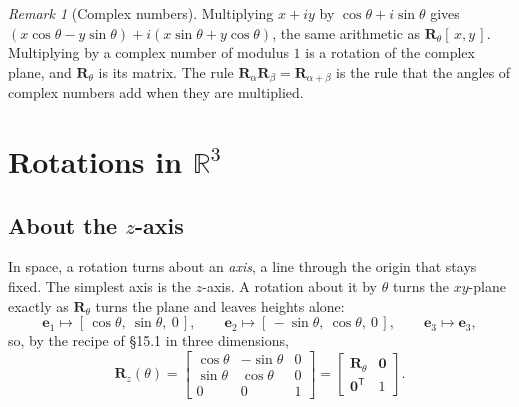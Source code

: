 \documentclass[11pt]{article}
\theoremstyle{plain}
\theoremstyle{definition}
\theoremstyle{remark}
\newtheorem*{rmk}{Remark}
\newcommand{\R}{\mathbb{R}}
\newcommand{\vc}[1]{\mathbf{#1}}
\newcommand{\mt}[1]{\mathbf{#1}}
\newcommand{\T}{^{\mathsf{T}}}
\begin{document}
\begin{rmk}[Complex numbers]
Multiplying $x+iy$ by $\cos\theta+i\sin\theta$ gives
$(x\cos\theta-y\sin\theta)+i(x\sin\theta+y\cos\theta)$, the same arithmetic as
$\mt{R}_\theta[\,x,y\,]$. Multiplying by a complex number of modulus $1$ is a
rotation of the complex plane, and $\mt{R}_\theta$ is its matrix. The rule
$\mt{R}_\alpha\mt{R}_\beta=\mt{R}_{\alpha+\beta}$ is the rule that the angles of
complex numbers add when they are multiplied.
\end{rmk}

\section{Rotations in \texorpdfstring{$\R^{3}$}{R3}}

\subsection{About the \texorpdfstring{$z$}{z}-axis}
In space, a rotation turns about an \emph{axis}, a line through the origin that
stays fixed. The simplest axis is the $z$-axis. A rotation about it by $\theta$
turns the $xy$-plane exactly as $\mt{R}_\theta$ turns the plane and leaves
heights alone:
\[
  \vc{e}_1\mapsto[\,\cos\theta,\ \sin\theta,\ 0\,],\qquad
  \vc{e}_2\mapsto[\,-\sin\theta,\ \cos\theta,\ 0\,],\qquad
  \vc{e}_3\mapsto\vc{e}_3 ,
\]
so, by the recipe of \S15.1 in three dimensions,
\[
  \mt{R}_z(\theta)=\begin{bmatrix}\cos\theta&-\sin\theta&0\\
                                  \sin\theta&\cos\theta&0\\
                                  0&0&1\end{bmatrix}
  =\begin{bmatrix}\mt{R}_\theta&\vc{0}\\\vc{0}\T&1\end{bmatrix}.
\]

\end{document}
